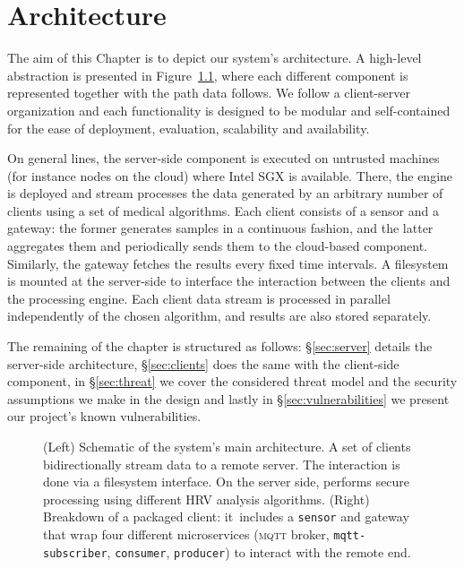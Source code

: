 \chapter{Architecture} \label{chap:architecture}

The aim of this Chapter is to depict our system's architecture.
A high-level abstraction is presented in Figure~\ref{fig:system-architecture}, where each different component is represented together with the path data follows.
We follow a client-server organization and each functionality is designed to be modular and self-contained for the ease of deployment, evaluation, scalability and availability.

On general lines, the server-side component is executed on untrusted machines (for instance nodes on the cloud) where Intel SGX is available.
There, the \sgxspark engine is deployed and stream processes the data generated by an arbitrary number of clients using a set of medical algorithms.
Each client consists of a sensor and a gateway: the former generates samples in a continuous fashion, and the latter aggregates them and periodically sends them to the cloud-based component.
Similarly, the gateway fetches the results every fixed time intervals.
A filesystem is mounted at the server-side to interface the interaction between the clients and the processing engine.
Each client data stream is processed in parallel independently of the chosen algorithm, and results are also stored separately.

The remaining of the chapter is structured as follows: \S\ref{sec:server} details the server-side architecture, \S\ref{sec:clients} does the same with the client-side component, in \S\ref{sec:threat} we cover the considered threat model and the security assumptions we make in the design and lastly in \S\ref{sec:vulnerabilities} we present our project's known vulnerabilities.

\begin{figure}[h!]
    \centering
    
    \caption[Schematic of the system's main architecture.]{(Left) Schematic of the system's main architecture. A set of clients bidirectionally stream data to a remote server. The interaction is done via a filesystem interface. On the server side, \sgxspark performs secure processing using different HRV analysis algorithms. (Right) Breakdown of a packaged client: it includes a \texttt{sensor} and gateway that wrap four different microservices (\textsc{mqtt} broker, \texttt{mqtt-subscriber}, \texttt{consumer}, \texttt{producer}) to interact with the remote end. \label{fig:system-architecture}}
\end{figure}

